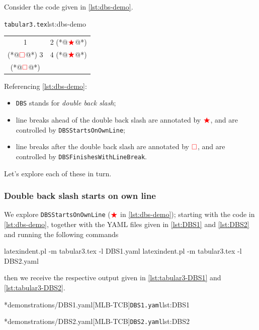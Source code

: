 	Consider the code given in \cref{lst:dbs-demo}.
	\begin{cmhlistings}[style=tcblatex,escapeinside={(*@}{@*)}]{\texttt{tabular3.tex}}{lst:dbs-demo}
\begin{tabular}{cc}
 1 & 2 (*@$\color{red}\bigstar$@*)\\(*@$\color{red}\square$@*) 3 & 4 (*@$\color{red}\bigstar$@*)\\(*@$\color{red}\square$@*)
\end{tabular}
\end{cmhlistings}
	Referencing \cref{lst:dbs-demo}:
	\begin{itemize}
		\item \texttt{DBS} stands for \emph{double back slash};
		\item line breaks ahead of the double back slash are annotated by $\color{red}\bigstar$,
		      and are controlled by \texttt{DBSStartsOnOwnLine};
		\item line breaks after the double back slash are annotated by $\color{red}\square$, and
		      are controlled by \texttt{DBSFinishesWithLineBreak}.
	\end{itemize}

	Let's explore each of these in turn.

\subsubsection{Double back slash starts on own line}
	We explore \texttt{DBSStartsOnOwnLine} ($\color{red}\bigstar$ in \cref{lst:dbs-demo}); starting with the code in
	\cref{lst:dbs-demo}, together with the YAML files given in
	\cref{lst:DBS1} and \cref{lst:DBS2} and running the following
	commands
	\begin{commandshell}
latexindent.pl -m tabular3.tex -l DBS1.yaml
latexindent.pl -m tabular3.tex -l DBS2.yaml
\end{commandshell}
	then we receive the respective output given in \cref{lst:tabular3-DBS1} and
	\cref{lst:tabular3-DBS2}.

	\begin{cmhtcbraster}[raster column skip=.01\linewidth]
		\cmhlistingsfromfile[style=yaml-LST]*{demonstrations/DBS1.yaml}[MLB-TCB]{\texttt{DBS1.yaml}}{lst:DBS1}
	\end{cmhtcbraster}

	\begin{cmhtcbraster}[raster column skip=.01\linewidth]
		\cmhlistingsfromfile[style=yaml-LST]*{demonstrations/DBS2.yaml}[MLB-TCB]{\texttt{DBS2.yaml}}{lst:DBS2}
	\end{cmhtcbraster}


